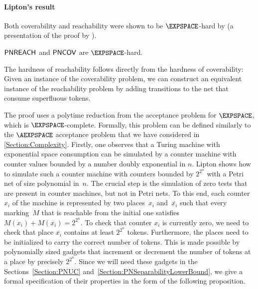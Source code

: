 \documentclass[../../diss.tex]{subfiles}
\begin{document}
\paragraph{Lipton's result}

Both coverability and reachability were shown to be $\EXPSPACE$-hard by  (\cf a presentation of the proof by ).

\begin{theorem}%
\label{Theorem:PNLipton}%
    $\mathsf{PNREACH}$ and $\mathsf{PNCOV}$ are $\EXPSPACE$-hard.
\end{theorem}

The hardness of reachability follows directly from the hardness of coverability:
Given an instance of the coverability problem, we can construct an equivalent instance of the reachability problem by adding transitions to the net that consume superfluous tokens.

The proof uses a polytime reduction from the acceptance problem for $\EXPSPACE$, which is $\EXPSPACE$-complete.
Formally, this problem can be defined similarly to the $\AEXPSPACE$ acceptance problem that we have considered in \cref{Section:Complexity}.
Firstly, one observes that a Turing machine with exponential space consumption can be simulated by a counter machine with counter values bounded by a number doubly exponential in $n$.
Lipton shows how to simulate such a counter machine with counters bounded by $2^{2^n}$ with a Petri net of size polynomial in~$n$.
The crucial step is the simulation of zero tests that are present in counter machines, but not in Petri nets.
To this end, each counter~$x_i$ of the machine is represented by two places~$x_i$ and~$\overline{x_i}$ such that every marking~$M$ that is reachable from the initial one satisfies $M(x_i) + M(\overline{x_i}) = 2^{2^n}$.
To check that counter $x_i$ is currently zero, we need to check that place $\overline{x_i}$ contains at least $2^{2^n}$ tokens.
Furthermore, the places need to be initialized to carry the correct number of tokens.
This is made possible by polynomially sized gadgets that increment or decrement the number of tokens at a place by precisely $2^{2^n}$.
Since we will need these gadgets in the Sections~\ref{Section:PNUC} and~\ref{Section:PNSeparabilityLowerBound}, we give a formal specification of their properties in the form of the following proposition.

%
\cheatpagebreak
%
\end{document}
